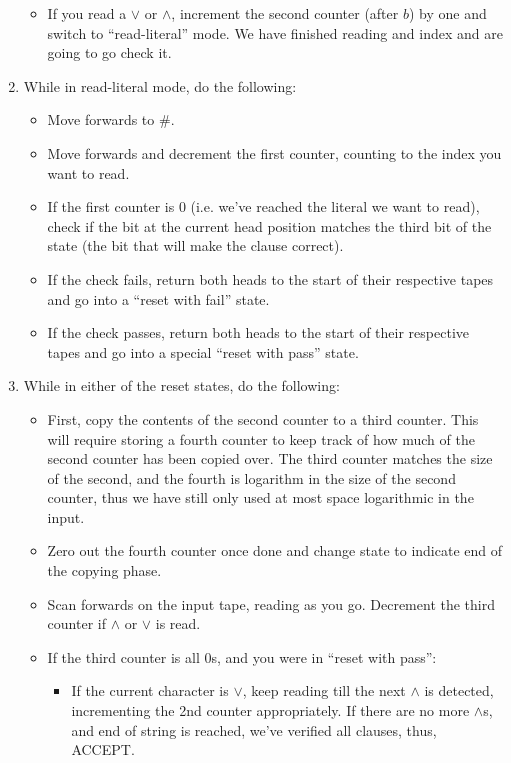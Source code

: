 \documentclass[12pt]{article}
\begin{document}
\begin{solution}
\begin{enumerate}
\begin{itemize}
            \item If you read a $\lor$ or $\land$, increment the second counter (after $b$) by one and switch to ``read-literal'' mode. We have finished reading and index and are going to go check it. 
        \end{itemize}
        \item While in read-literal mode, do the following: 
        \begin{itemize}
            \item Move forwards to \#.  
            \item Move forwards and decrement the first counter, counting to the index you want to read. 
            \item If the first counter is $0$ (i.e. we've reached the literal we want to read), check if the bit at the current head position matches the third bit of the state (the bit that will make the clause correct). 
            \item If the check fails, return both heads to the start of their respective tapes and go into a ``reset with fail'' state.
            \item If the check passes, return both heads to the start of their respective tapes and go into a special ``reset with pass'' state.  
        \end{itemize}
        \item While in either of the reset states, do the following: 
        \begin{itemize}
            \item First, copy the contents of the second counter to a third counter. This will require storing a fourth counter to keep track of how much of the second counter has been copied over. The third counter matches the size of the second, and the fourth is logarithm in the size of the second counter, thus we have still only used at most space logarithmic in the input.
            \item Zero out the fourth counter once done and change state to indicate end of the copying phase.
            \item Scan forwards on the input tape, reading as you go. Decrement the third counter if $\land$ or $\lor$ is read. 
            \item If the third counter is all $0$s, and you were in ``reset with pass'':
            \begin{itemize}
                \item If the current character is $\lor$, keep reading till the next $\land$ is detected, incrementing the 2nd counter appropriately. If there are no more $\land$s, and end of string is reached, we've verified all clauses, thus, ACCEPT. 

\end{itemize}
\end{itemize}
\end{enumerate}
\end{solution}
\end{document}
